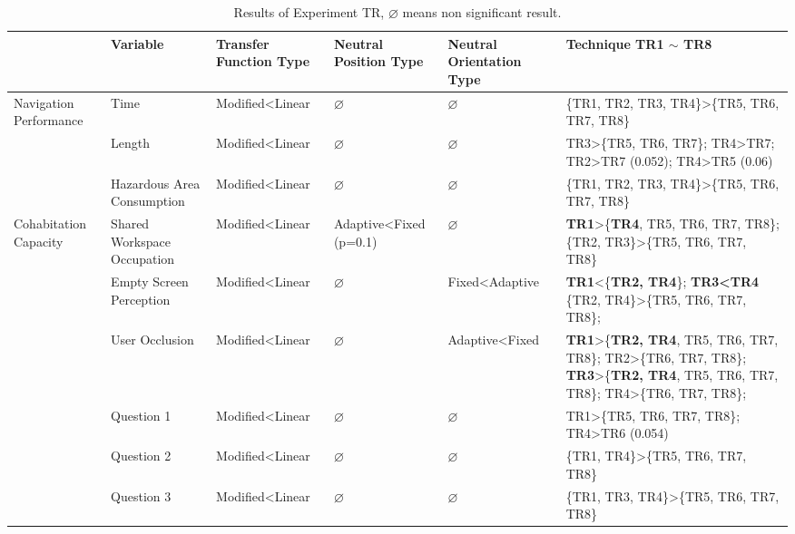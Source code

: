 \begin{table}
\caption{Results of Experiment TR, $\varnothing$ means non significant result.}
\label{tab:4_result_t3}
\centering
\small
\begin{tabular}{p{2cm} | p{3cm} l l l p{6cm}}
  \hline
   & Variable & Transfer Function Type & Neutral Position Type & Neutral Orientation Type & Technique TR1 $\sim$ TR8 \\
  \hline
  Navigation Performance & Time & Modified\textless Linear & $\varnothing$ & $\varnothing$ & \{TR1, TR2, TR3, TR4\}\textgreater \{TR5, TR6, TR7, TR8\} \\
  \cline{2-6}
   & Length & Modified\textless Linear & $\varnothing$ & $\varnothing$ & TR3\textgreater \{TR5, TR6, TR7\}; TR4\textgreater TR7; TR2\textgreater TR7 (0.052); TR4\textgreater TR5 (0.06) \\ \hline \hline
   & Hazardous Area Consumption & Modified\textless Linear & $\varnothing$ & $\varnothing$ & \{TR1, TR2, TR3, TR4\}\textgreater \{TR5, TR6, TR7, TR8\} \\
   \cline{2-6}
  Cohabitation Capacity & Shared Workspace Occupation & Modified\textless Linear & Adaptive\textless Fixed (p=0.1) & $\varnothing$ & \textbf{TR1}\textgreater \{\textbf{TR4}, TR5, TR6, TR7, TR8\}; \newline \{TR2, TR3\}\textgreater \{TR5, TR6, TR7, TR8\} \\
  \cline{2-6}
   & Empty Screen Perception & Modified\textless Linear & $\varnothing$ & Fixed\textless Adaptive & \textbf{TR1}\textless \{\textbf{TR2, TR4}\}; \textbf{TR3\textless TR4} \newline \{TR2, TR4\}\textgreater \{TR5, TR6, TR7, TR8\};  \\
   \cline{2-6}
   & User Occlusion & Modified\textless Linear & $\varnothing$ & Adaptive\textless Fixed & \textbf{TR1}\textgreater \{\textbf{TR2, TR4}, TR5, TR6, TR7, TR8\}; TR2\textgreater \{TR6, TR7, TR8\}; \textbf{TR3}\textgreater \{\textbf{TR2, TR4}, TR5, TR6, TR7, TR8\}; TR4\textgreater \{TR6, TR7, TR8\}; \\ \hline \hline
   & Question 1 & Modified\textless Linear & $\varnothing$ & $\varnothing$ & TR1\textgreater \{TR5, TR6, TR7, TR8\}; TR4\textgreater TR6 (0.054) \\
   \cline{2-6}
   & Question 2 & Modified\textless Linear & $\varnothing$ & $\varnothing$ & \{TR1, TR4\}\textgreater \{TR5, TR6, TR7, TR8\} \\
   \cline{2-6}
   & Question 3 & Modified\textless Linear & $\varnothing$ & $\varnothing$ & \{TR1, TR3, TR4\}\textgreater \{TR5, TR6, TR7, TR8\} \\

\end{tabular}
\end{table}
